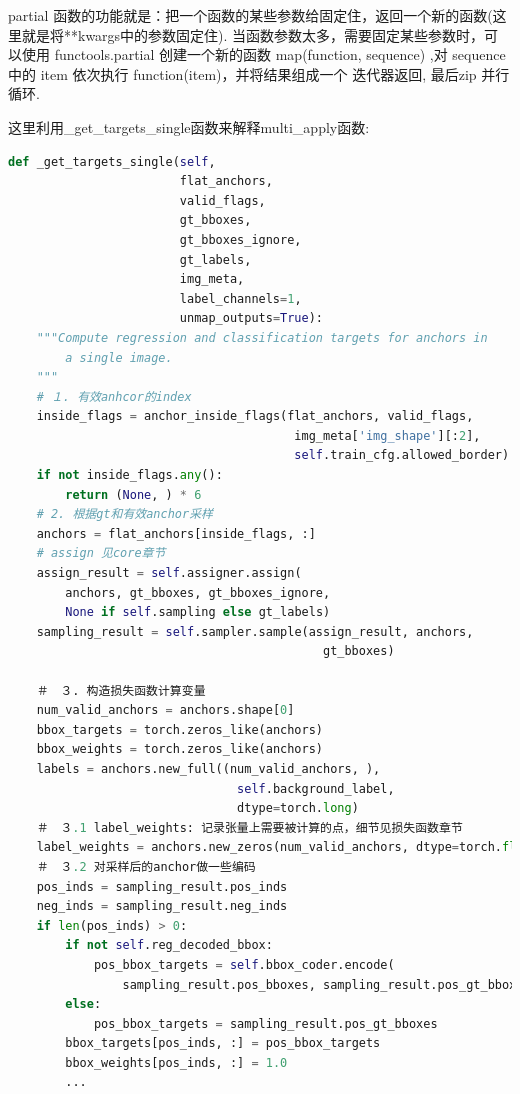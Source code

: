 \documentclass[UTF8]{ctexart}
\begin{document}
partial 函数的功能就是：把一个函数的某些参数给固定住，返回一个新的函数(这里就是将**kwargs中的参数固定住).
当函数参数太多，需要固定某些参数时，可以使用 functools.partial 创建一个新的函数
map(function, sequence) ,对 sequence 中的 item 依次执行 function(item)，并将结果组成一个 迭代器返回,
最后zip 并行循环.


这里利用\_get\_targets\_single函数来解释multi\_apply函数:

\lstset{style=mystyle}
\begin{lstlisting}[language=Python]
def _get_targets_single(self,
                        flat_anchors,
                        valid_flags,
                        gt_bboxes,
                        gt_bboxes_ignore,
                        gt_labels,
                        img_meta,
                        label_channels=1,
                        unmap_outputs=True):
    """Compute regression and classification targets for anchors in
        a single image.
    """
    # １. 有效anhcor的index
    inside_flags = anchor_inside_flags(flat_anchors, valid_flags,
                                        img_meta['img_shape'][:2],
                                        self.train_cfg.allowed_border)
    if not inside_flags.any():
        return (None, ) * 6
    # 2. 根据gt和有效anchor采样
    anchors = flat_anchors[inside_flags, :]
    # assign 见core章节
    assign_result = self.assigner.assign(
        anchors, gt_bboxes, gt_bboxes_ignore,
        None if self.sampling else gt_labels)
    sampling_result = self.sampler.sample(assign_result, anchors,
                                            gt_bboxes)
    
    ＃　３. 构造损失函数计算变量                                        
    num_valid_anchors = anchors.shape[0]
    bbox_targets = torch.zeros_like(anchors)
    bbox_weights = torch.zeros_like(anchors)
    labels = anchors.new_full((num_valid_anchors, ),
                                self.background_label,
                                dtype=torch.long)
    ＃　３.1 label_weights: 记录张量上需要被计算的点，细节见损失函数章节
    label_weights = anchors.new_zeros(num_valid_anchors, dtype=torch.float)
    ＃　３.2 对采样后的anchor做一些编码
    pos_inds = sampling_result.pos_inds
    neg_inds = sampling_result.neg_inds
    if len(pos_inds) > 0:
        if not self.reg_decoded_bbox:
            pos_bbox_targets = self.bbox_coder.encode(
                sampling_result.pos_bboxes, sampling_result.pos_gt_bboxes)
        else:
            pos_bbox_targets = sampling_result.pos_gt_bboxes
        bbox_targets[pos_inds, :] = pos_bbox_targets
        bbox_weights[pos_inds, :] = 1.0
        ...


\end{lstlisting}
\end{document}
